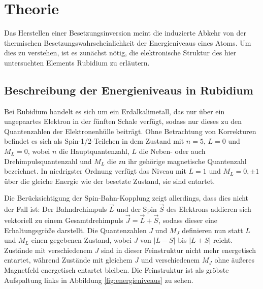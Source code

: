 \section{Theorie}
\label{sec:Theorie}
  Das Herstellen einer Besetzungsinversion meint die induzierte Abkehr von der thermischen Besetzungswahrscheinlichkeit der Energieniveaus eines Atoms.
  Um dies zu verstehen, ist es zunächst nötig, die elektronische Struktur des hier untersuchten Elements Rubidium zu erläutern.

  \subsection{Beschreibung der Energieniveaus in Rubidium}
  \label{subsec:energieniveaus}
  Bei Rubidium handelt es sich um ein Erdalkalimetall, das nur über ein ungepaartes Elektron in der fünften Schale verfügt, sodass nur dieses zu den Quantenzahlen der Elektronenhülle beiträgt.
  Ohne Betrachtung von Korrekturen befindet es sich als Spin-1/2-Teilchen in dem Zustand mit $n=5$, $L=0$ und $M_L=0$, wobei $n$ die Hauptquantenzahl, $L$ die Neben- oder auch Drehimpulsquantenzahl und $M_L$ die zu ihr gehörige magnetische Quantenzahl bezeichnet. In niedrigster Ordnung verfügt das Niveau mit $L=1$ und $M_L=0,\pm1$ über die gleiche Energie wie der besetzte Zustand, sie sind entartet.

  Die Berücksichtigung der Spin-Bahn-Kopplung zeigt allerdings, dass dies nicht der Fall ist: Der Bahndrehimpuls $\vec{L}$ und der Spin $\vec{S}$ des Elektrons addieren sich vektoriell zu einem Gesamtdrehimpuls $\vec{J}=\vec{L}+\vec{S}$, sodass dieser eine Erhaltungsgröße darstellt. Die Quantenzahlen $J$ und $M_J$ definieren nun statt $L$ und $M_L$ einen gegebenen Zustand, wobei $J$ von $\lvert L - S \rvert$ bis $\lvert L + S \rvert$ reicht. Zustände mit verschiedenem $J$ sind in dieser Feinstruktur nicht mehr energetisch entartet, während Zustände mit gleichem $J$ und verschiedenem $M_J$ ohne äußeres Magnetfeld energetisch entartet bleiben.
  Die Feinstruktur ist als gröbste Aufspaltung links in Abbildung \ref{fig:energieniveaus} zu sehen.


